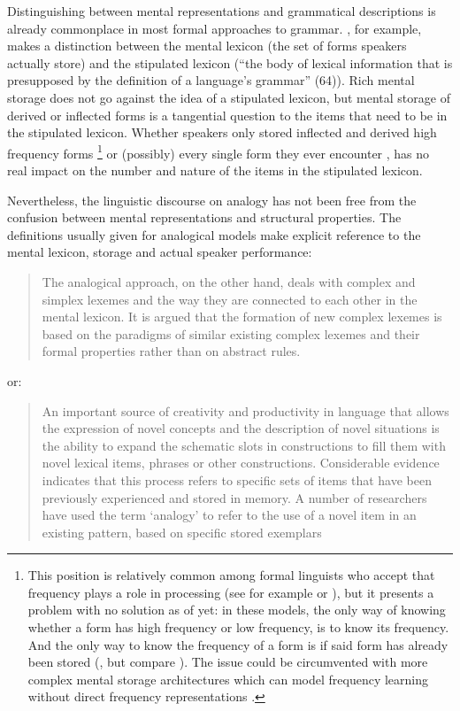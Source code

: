 Distinguishing between mental representations and grammatical descriptions is already commonplace in most formal approaches to grammar. \textcite[63--64]{Stump.2016}, for example, makes a distinction between the mental lexicon (the set of forms speakers actually store) and the stipulated lexicon (``the body of lexical information that is presupposed by the definition of a language's grammar'' (64)). Rich mental storage does not go against the idea of a stipulated lexicon, but mental storage of derived or inflected forms is a tangential question to the items that need to be in the stipulated lexicon. Whether speakers only stored inflected and derived high frequency forms \autocites{Pinker.2002, Ullman.2001, Ullman.2004}\footnote{This position is relatively common among formal linguists who accept that frequency plays a role in processing (see for example \citealt{Stump.2016} or \citealt{Muller.2014}), but it presents a problem with no solution as of yet: in these models, the only way of knowing whether a form has high frequency or low frequency, is to know its frequency. And the only way to know the frequency of a form is if said form has already been stored (\citealt{Bybee.2010}, but compare \citealt{Baayen.2013a}). The issue could be circumvented with more complex mental storage architectures which can model frequency learning without direct frequency representations \autocites{Baayen.2011, Baayen.2011a, Baayen.2010, Baayen.2013a}.} or (possibly) every single form they ever encounter \autocites{Baayen.2007, DeVaan.2007}, has no real impact on the number and nature of the items in the stipulated lexicon.

Nevertheless, the linguistic discourse on analogy has not been free from the confusion between mental representations and structural properties. The definitions usually given for analogical models make explicit reference to the mental lexicon, storage and actual speaker performance:

\begin{quotation}
  The analogical approach, on the other hand, deals with complex and simplex lexemes and the way they are connected to each other in the mental lexicon. It is argued that the formation of new complex lexemes is based on the paradigms of similar existing complex lexemes and their formal properties rather than on abstract rules. \autocite[1540]{Schlucker.2011}
\end{quotation}

or:

\begin{quotation}
  An important source of creativity and productivity in language that allows the expression of novel concepts and the description of novel situations is the ability to expand the schematic slots in constructions to fill them with novel lexical items, phrases or other constructions. Considerable evidence indicates that this process refers to specific sets of items that have been previously experienced and stored in memory. A number of researchers have used the term `analogy' to refer to the use of a novel item in an existing pattern, based on specific stored exemplars \autocite[57]{Bybee.2010}
\end{quotation}

